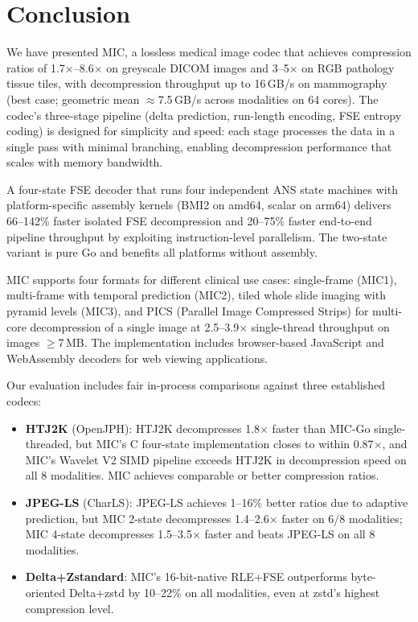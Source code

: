 \documentclass[11pt,twocolumn]{article}
\begin{document}
\section{Conclusion}
\label{sec:conclusion}

We have presented MIC, a lossless medical image codec that achieves compression ratios of 1.7$\times$--8.6$\times$ on greyscale DICOM images and 3--5$\times$ on RGB pathology tissue tiles, with decompression throughput up to 16\,GB/s on mammography (best case; geometric mean $\approx$7.5\,GB/s across modalities on 64 cores).
The codec's three-stage pipeline (delta prediction, run-length encoding, FSE entropy coding) is designed for simplicity and speed: each stage processes the data in a single pass with minimal branching, enabling decompression performance that scales with memory bandwidth.

A four-state FSE decoder that runs four independent ANS state machines with platform-specific assembly kernels (BMI2 on amd64, scalar on arm64) delivers 66--142\% faster isolated FSE decompression and 20--75\% faster end-to-end pipeline throughput by exploiting instruction-level parallelism.
The two-state variant is pure Go and benefits all platforms without assembly.

MIC supports four formats for different clinical use cases: single-frame (MIC1), multi-frame with temporal prediction (MIC2), tiled whole slide imaging with pyramid levels (MIC3), and PICS (Parallel Image Compressed Strips) for multi-core decompression of a single image at 2.5--3.9$\times$ single-thread throughput on images $\geq$7\,MB.
The implementation includes browser-based JavaScript and WebAssembly decoders for web viewing applications.

Our evaluation includes fair in-process comparisons against three established codecs:
\begin{itemize}[nosep]
    \item \textbf{HTJ2K} (OpenJPH): HTJ2K decompresses 1.8$\times$ faster than MIC-Go single-threaded, but MIC's C four-state implementation closes to within 0.87$\times$, and MIC's Wavelet V2 SIMD pipeline exceeds HTJ2K in decompression speed on all 8 modalities. MIC achieves comparable or better compression ratios.
    \item \textbf{JPEG-LS} (CharLS): JPEG-LS achieves 1--16\% better ratios due to adaptive prediction, but MIC 2-state decompresses 1.4--2.6$\times$ faster on 6/8 modalities; MIC 4-state decompresses 1.5--3.5$\times$ faster and beats JPEG-LS on all 8 modalities.
    \item \textbf{Delta+Zstandard}: MIC's 16-bit-native RLE+FSE outperforms byte-oriented Delta+zstd by 10--22\% on all modalities, even at zstd's highest compression level.
\end{itemize}
\end{document}
